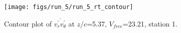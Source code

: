 \begin{figure}[H]
\centering
\texttt{[image: figs/run\_5/run\_5\_rt\_contour]}
\caption{Contour plot of $\overline{v_{r}^{\prime} v_{\theta}^{\prime}}$ at $z/c$=5.37, $V_{free}$=23.21, station 1.}
\label{fig:run_5_rt_contour}
\end{figure}


